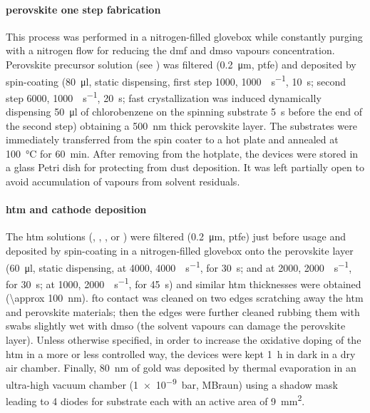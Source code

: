 
		\paragraph{ perovskite one step fabrication}

		This process was performed in a nitrogen-filled glovebox
		while constantly purging with a nitrogen flow for reducing the \gls{dmf} and \gls{dmso} vapours concentration.
		Perovskite precursor solution (see ) was filtered (\SI{0.2}{\um}, \gls{ptfe})
		and deposited by spin-coating (\SI{80}{\ul}, static dispensing, first step \SI{1000}{\rpm}, \SI{1000}{\rpm\per\s}, \SI{10}{\s};
		second step \SI{6000}{\rpm}, \SI{1000}{\rpm\per\s}, \SI{20}{\s}; fast crystallization was induced dynamically
		dispensing \SI{50}{\ul} of chlorobenzene on the spinning substrate \SI{5}{\s} before the end of the second
		step) obtaining a \SI{500}{\nm} thick perovskite layer.
		The substrates were immediately transferred from
		the spin coater to a hot plate and annealed at \SI{100}{\celsius} for \SI{60}{\minute}.
		After removing from the hotplate, the devices were stored in a glass Petri dish for protecting from dust deposition. It was left partially open to avoid accumulation of vapours from solvent residuals.

		\paragraph{\Gls{htm} and cathode deposition}
		The \gls{htm} solutions (\spiro, , , or ) were filtered (\SI{0.2}{\um}, \gls{ptfe}) just before usage and deposited by spin-coating in a nitrogen-filled glovebox
		onto the perovskite layer (\SI{60}{\ul}, static dispensing, \spiro at \SI{4000}{\rpm}, \SI{4000}{\rpm\per\s},
		for \SI{30}{\s};  and  at \SI{2000}{\rpm}, \SI{2000}{\rpm\per\s}, for \SI{30}{\s};  at \SI{1000}{\rpm}, \SI{2000}{\rpm\per\s},
		for \SI{45}{\s}) and similar \gls{htm} thicknesses were obtained (\SI{\approx 100}{\nm}).
		\Gls{fto} contact was cleaned on two edges scratching away the \gls{htm} and perovskite materials; then the edges were further cleaned rubbing them with swabs slightly wet with \gls{dmso} (the solvent vapours can damage the perovskite layer). %
		Unless otherwise specified, in order to increase the
		oxidative doping of the \gls{htm} in a more or less controlled way, the devices were kept \SI{1}{\hour} in dark in a dry air chamber.
		Finally, \SI{80}{\nm} of gold was deposited by thermal evaporation in an ultra-high vacuum chamber
		(\SI{1e-9}{\bar}, MBraun) using a shadow mask leading to 4 diodes for substrate each with an active area of
		\SI{9}{\mm\squared}.

